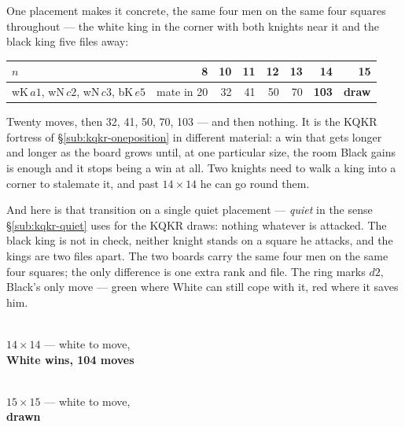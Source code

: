 \documentclass[11pt]{article}
\begin{document}
\noindent
One placement makes it concrete, the same four men on the same four squares
throughout --- the white king in the corner with both knights near it and the
black king five files away:

\begin{center}\small
\begin{tabular}{@{}lrrrrrrr@{}}
\toprule
$n$ & 8 & 10 & 11 & 12 & 13 & \textbf{14} & \textbf{15} \\
\midrule
wK\,$a1$, wN\,$c2$, wN\,$c3$, bK\,$e5$ & mate in 20 & 32 & 41 & 50 & 70 &
\textbf{103} & \textbf{draw} \\
\bottomrule
\end{tabular}
\end{center}

\noindent
Twenty moves, then 32, 41, 50, 70, 103 --- and then nothing. It is the KQKR
fortress of \S\ref{sub:kqkr-oneposition} in different material: a win that gets longer and longer as
the board grows until, at one particular size, the room Black gains is enough
and it stops being a win at all. Two knights need to walk a king into a corner
to stalemate it, and past $14\times14$ he can go round them.

\smallskip
\noindent
\noindent
And here is that transition on a single quiet placement --- \emph{quiet} in the
sense \S\ref{sub:kqkr-quiet} uses for the KQKR draws: nothing whatever is attacked. The black
king is not in check, neither knight stands on a square he attacks, and the
kings are two files apart. The two boards carry the same four men on the same
four squares; the only difference is one extra rank and file. The ring marks
$d2$, Black's only move --- \textcolor{arrowW}{green} where White can still
cope with it, \textcolor{arrowB}{red} where it saves him.

\begin{center}
\begin{minipage}{0.49\textwidth}\centering
{}\\[2mm]
{\small\color{knnk}$14\times14$ --- white to move,\\\textbf{White wins, 104 moves}}
\end{minipage}\hfill
\begin{minipage}{0.49\textwidth}\centering
{}\\[2mm]
{\small\color{knnk}$15\times15$ --- white to move,\\\textbf{drawn}}
\end{minipage}
\end{center}
\end{document}
